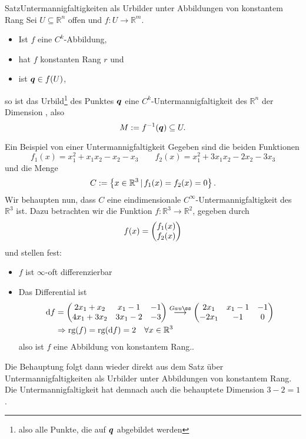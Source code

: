 \begin{Satz}
{Satz}{Untermannigfaltigkeiten als Urbilder unter Abbildungen von konstantem Rang}
Sei $U\subseteq\mathbb{R}^n$ offen und $f:U\to\mathbb{R}^m$.
\begin{itemize}
    \item Ist $f$ eine $C^k$-Abbildung,
    \item hat $f$ konstanten Rang $r$ und
    \item ist ${{\text{\boldmath${q}$}}}\in f(U)$,
\end{itemize}
so ist das Urbild\footnote{also alle Punkte, die auf ${{\text{\boldmath${q}$}}}$ abgebildet werden} des Punktes ${{\text{\boldmath${q}$}}}$ eine $C^k$-Untermannigfaltigkeit des $\mathbb{R}^n$ der Dimension , also
\begin{equation}
    M:=f^{-1}({{\text{\boldmath${q}$}}})\subseteq U.
\end{equation}
\end{Satz}
\begin{Beispiel}
    {Ein Beispiel von einer Untermannigfaltigkeit}
    Gegeben sind die beiden Funktionen
    \begin{equation*}
        f_1(x)=x_1^2+x_1x_2-x_2-x_3 \qquad f_2(x)=x_1^2+3x_1x_2-2x_2-3x_3
    \end{equation*}
    und die Menge
    \begin{equation*}
        C:=\left\{x\in\mathbb{R}^3\,|\, f_1(x)=f_2(x)=0\right\}.
    \end{equation*}
    Wir behaupten nun, dass $C$ eine eindimensionale $C^{\infty}$-Untermannigfaltigkeit des $\mathbb{R}^3$ ist. Dazu betrachten wir die Funktion $f:\mathbb{R}^3\rightarrow\mathbb{R}^2$, gegeben durch
    \begin{equation*}
        f(x)=\begin{pmatrix}f_1(x) \\ f_2(x)\end{pmatrix}
    \end{equation*}
    und stellen fest:
    \begin{itemize}
        \item $f$ ist $\infty$-oft differenzierbar
        \item Das Differential ist
        \begin{align*}
            \text{d}f&=\Matrix{2x_1+x_2 & x_1-1 & -1 \\ 4x_1+3x_2 & 3x_1-2 & -3} \overset{Gauß}{\longrightarrow} \Matrix{2x_1 & x_1-1 & -1 \\ -2x_1 & -1 & 0} \\
            &\Rightarrow \text{rg}(f)=\text{rg}(\text{d}f)=2 \quad \forall x\in\mathbb{R}^3
        \end{align*}
        also ist $f$ eine Abbildung von konstantem Rang..
    \end{itemize}
    Die Behauptung folgt dann wieder direkt aus dem Satz über Untermannigfaltigkeiten als Urbilder unter Abbildungen von konstantem Rang. Die Untermannigfaltigkeit hat demnach auch die behauptete Dimension $3-2=1$.
\end{Beispiel}
